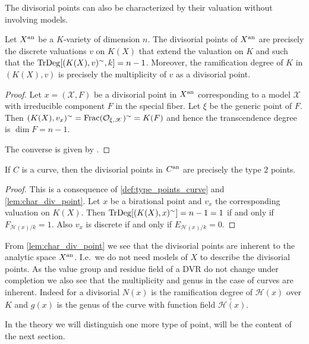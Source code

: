 The divisorial points can also be characterized by their valuation without involving models. 
\begin{lemma}\label{lem:char_div_point}
	Let $X{}^{\text{an}}$ be a $K$-variety of dimension $n$. 
	The divisorial points of $X{}^{\text{an}}$ are precisely the discrete valuations $v$ on $K(X)$ that extend the valuation on $K$ and such that the $\operatorname{TrDeg} [(K(X),v)^{\sim}, k] = n-1$.
	Moreover, the ramification degree of $K$ in $(K(X), v)$ is precisely the multiplicity of $v$ as a divisorial point.  
\end{lemma}
\begin{proof}
	Let $x = (\mathscr X, F)$ be a divisorial point in $X{}^{\text{an}}$ corresponding to a model $\mathscr X$ with irreducible component $F$ in the special fiber.
	Let $\xi$ be the generic point of $F$. 
	Then $(K(X), v_x)^{\sim} = \operatorname{Frac}(\mathcal{O}_{\xi, \mathscr X})^{\sim} = K(F)$ and hence the transcendence degree is $\dim F = n-1$.

	The converse is given by \cite[lem 2.45]{kollarBirationalGeometryAlgebraic1998}. 
\end{proof}

\begin{remark}
	 If $C$ is a curve, then the divisorial points in $C{}^{\text{an}}$ are precisely the type $2$ points. 
\end{remark}
\begin{proof}
	This is a consequence of \cref{def:type_points_curve} and \cref{lem:char_div_point}.
	Let $x$ be a birational point and $v_x$ the corresponding valuation on $K(X)$.
	Then $\operatorname{TrDeg}[(K(X),x)^{\sim} ] = n-1 = 1 $ if and only if $F_{\mathcal{H} (x) / k} = 1$.
	Also $v_x$ is discrete if and only if $E_{\mathcal{H} (x) / k}= 0$. 
\end{proof}


\begin{remark}
	From \cref{lem:char_div_point} we see that the divisorial points are inherent to the analytic space $X{}^{\text{an}}$. 
	I.e.\ we do not need models of $X$ to describe the divisorial points. 
	As the value group and residue field of a DVR do not change under completion we also see that the multiplicity and genus in the case of curves are inherent. 
	Indeed for a divisorial $N(x)$ is the ramification degree of $\mathcal{H} (x)$ over $K$ and $g(x)$ is the genus of the curve with function field $\widetilde{\mathcal{H} (x)}$. 
\end{remark}

In the theory we will distinguish one more type of point, will be the content of the next section.
